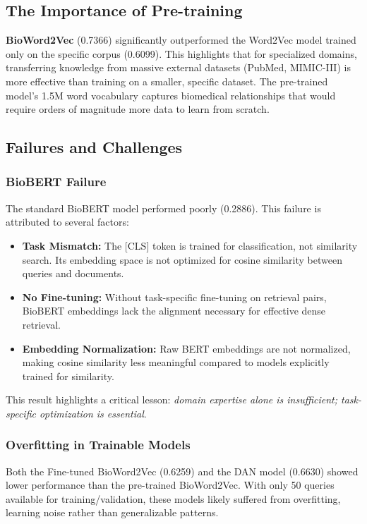 \documentclass[sigconf,nonacm]{acmart}
\begin{document}
\subsection{The Importance of Pre-training}
\textbf{BioWord2Vec} (0.7366) significantly outperformed the Word2Vec model trained only on the specific corpus (0.6099). This highlights that for specialized domains, transferring knowledge from massive external datasets (PubMed, MIMIC-III) is more effective than training on a smaller, specific dataset. The pre-trained model's 1.5M word vocabulary captures biomedical relationships that would require orders of magnitude more data to learn from scratch.

\subsection{Failures and Challenges}

\subsubsection{BioBERT Failure}
The standard BioBERT model performed poorly (0.2886). This failure is attributed to several factors:
\begin{itemize}
    \item \textbf{Task Mismatch:} The [CLS] token is trained for classification, not similarity search. Its embedding space is not optimized for cosine similarity between queries and documents.
    \item \textbf{No Fine-tuning:} Without task-specific fine-tuning on retrieval pairs, BioBERT embeddings lack the alignment necessary for effective dense retrieval.
    \item \textbf{Embedding Normalization:} Raw BERT embeddings are not normalized, making cosine similarity less meaningful compared to models explicitly trained for similarity.
\end{itemize}

This result highlights a critical lesson: \textit{domain expertise alone is insufficient; task-specific optimization is essential}.

\subsubsection{Overfitting in Trainable Models}
Both the Fine-tuned BioWord2Vec (0.6259) and the DAN model (0.6630) showed lower performance than the pre-trained BioWord2Vec. With only 50 queries available for training/validation, these models likely suffered from overfitting, learning noise rather than generalizable patterns.
\end{document}
